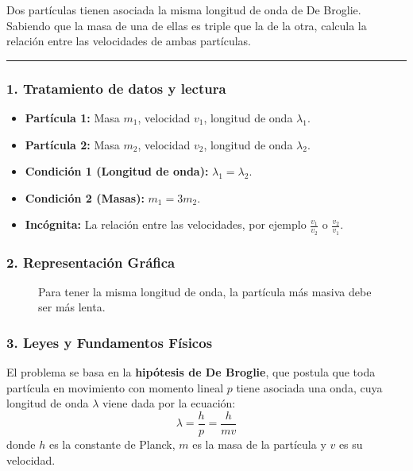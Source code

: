 \begin{cajaenunciado}
Dos partículas tienen asociada la misma longitud de onda de De Broglie. Sabiendo que la masa de una de ellas es triple que la de la otra, calcula la relación entre las velocidades de ambas partículas.
\end{cajaenunciado}
\hrule

\subsubsection*{1. Tratamiento de datos y lectura}
\begin{itemize}
    \item \textbf{Partícula 1:} Masa $m_1$, velocidad $v_1$, longitud de onda $\lambda_1$.
    \item \textbf{Partícula 2:} Masa $m_2$, velocidad $v_2$, longitud de onda $\lambda_2$.
    \item \textbf{Condición 1 (Longitud de onda):} $\lambda_1 = \lambda_2$.
    \item \textbf{Condición 2 (Masas):} $m_1 = 3 m_2$.
    \item \textbf{Incógnita:} La relación entre las velocidades, por ejemplo $\frac{v_1}{v_2}$ o $\frac{v_2}{v_1}$.
\end{itemize}

\subsubsection*{2. Representación Gráfica}
\begin{figure}[H]
    \centering
    \caption{Para tener la misma longitud de onda, la partícula más masiva debe ser más lenta.}
\end{figure}

\subsubsection*{3. Leyes y Fundamentos Físicos}
El problema se basa en la \textbf{hipótesis de De Broglie}, que postula que toda partícula en movimiento con momento lineal $p$ tiene asociada una onda, cuya longitud de onda $\lambda$ viene dada por la ecuación:
$$ \lambda = \frac{h}{p} = \frac{h}{mv} $$
donde $h$ es la constante de Planck, $m$ es la masa de la partícula y $v$ es su velocidad.

